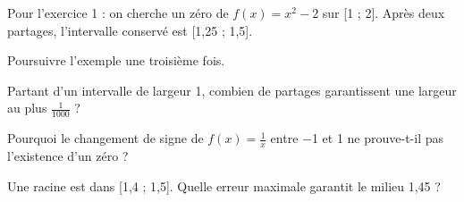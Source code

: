\documentclass[11pt]{article}
\begin{document}
Pour l’exercice 1 : on cherche un zéro de \(f(x)=x^{2}-2\) sur [1 ; 2]. Après deux partages, l’intervalle conservé est [1,25 ; 1,5].\par
\vspace{5pt}
Poursuivre l’exemple une troisième fois.\par
\vspace{5pt}
Partant d’un intervalle de largeur 1, combien de partages garantissent une largeur au plus \(\frac{1}{1000}\) ?\par
\vspace{5pt}
Pourquoi le changement de signe de \(f(x)=\frac{1}{x}\) entre −1 et 1 ne prouve-t-il pas l’existence d’un zéro ?\par
\vspace{5pt}
Une racine est dans [1,4 ; 1,5]. Quelle erreur maximale garantit le milieu 1,45 ?\par
\vspace{5pt}
\end{document}
